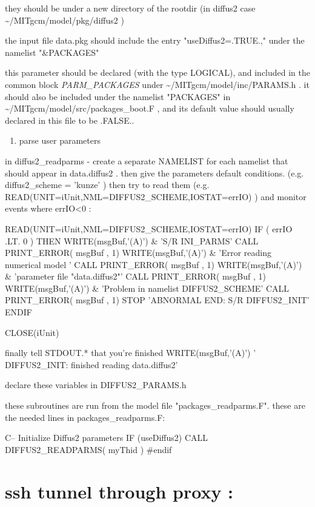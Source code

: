 \documentclass[11pt]{article}
\begin{document}
they should be under a new directory of the rootdir (in diffus2 case \textasciitilde{}/MITgcm/model/pkg/diffus2 )

the input file data.pkg should include the entry "useDiffus2=.TRUE.," under the namelist "\&PACKAGES"

this parameter should be declared (with the type LOGICAL), and included in the common block \emph{PARM\_PACKAGES} under \textasciitilde{}/MITgcm/model/inc/PARAMS.h .  it should also be included under the namelist "PACKAGES" in \textasciitilde{}/MITgcm/model/src/packages\_boot.F , and its default value should usually declared in this file to be .FALSE..

\begin{enumerate}
\item parse user parameters
\end{enumerate}

in diffus2\_readparms - create a separate NAMELIST for each namelist that should appear in data.diffus2 .
then give the parameters default conditions.  (e.g.       diffus2\_scheme    = 'kunze' )
then try to read them    (e.g.   READ(UNIT=iUnit,NML=DIFFUS2\_SCHEME,IOSTAT=errIO) ) and monitor events where errIO<0 :

 READ(UNIT=iUnit,NML=DIFFUS2\_SCHEME,IOSTAT=errIO)
 IF ( errIO .LT. 0 ) THEN
  WRITE(msgBuf,'(A)')
\&  'S/R INI\_PARMS'
  CALL PRINT\_ERROR( msgBuf , 1)
  WRITE(msgBuf,'(A)')
\&  'Error reading numerical model '
  CALL PRINT\_ERROR( msgBuf , 1)
  WRITE(msgBuf,'(A)')
\&  'parameter file "data.diffus2"'
  CALL PRINT\_ERROR( msgBuf , 1)
  WRITE(msgBuf,'(A)')
\&  'Problem in namelist DIFFUS2\_SCHEME'
  CALL PRINT\_ERROR( msgBuf , 1)
  STOP 'ABNORMAL END: S/R DIFFUS2\_INIT'
 ENDIF

CLOSE(iUnit)

finally tell STDOUT.* that you're finished
      WRITE(msgBuf,'(A)') ' DIFFUS2\_INIT: finished reading data.diffus2'

declare these variables in DIFFUS2\_PARAMS.h

these subroutines are run from the model file "packages\_readparms.F". these are the needed lines in packages\_readparms.F:

C--   Initialize Diffus2 parameters
      IF (useDiffus2) CALL DIFFUS2\_READPARMS( myThid )
\#endif

\section{ssh tunnel through proxy :}
\label{sec-30}
\end{document}
